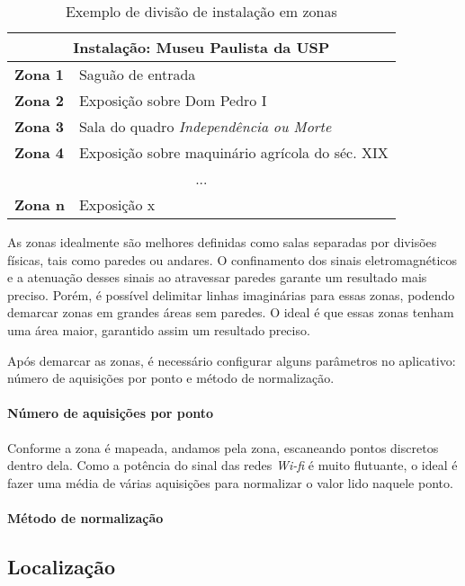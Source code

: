 \begin{table}[htb]
\centering
\caption{Exemplo de divisão de instalação em zonas}
\label{my-label}
\begin{tabular}{|l|l|l|l|l|}
\hline
\multicolumn{5}{|c|}{\textbf{Instalação: Museu Paulista da USP}}             \\ \hline
\multicolumn{2}{|l|}{\textbf{Zona 1}} & \multicolumn{3}{l|}{Saguão de entrada}          \\ \hline
\multicolumn{2}{|l|}{\textbf{Zona 2}} & \multicolumn{3}{l|}{Exposição sobre Dom Pedro I}          \\ \hline
\multicolumn{2}{|l|}{\textbf{Zona 3}} & \multicolumn{3}{l|}{Sala do quadro \textit{Independência ou Morte}}          \\ \hline
\multicolumn{2}{|l|}{\textbf{Zona 4}} & \multicolumn{3}{l|}{Exposição sobre maquinário agrícola do séc. XIX}          \\ \hline
\multicolumn{5}{|c|}{...}                                                    \\ \hline
\multicolumn{2}{|l|}{\textbf{Zona n}} & \multicolumn{3}{l|}{Exposição x}     \\ \hline
\end{tabular}
\end{table}

As zonas idealmente são melhores definidas como salas separadas por divisões físicas, tais como paredes ou andares. O confinamento dos sinais eletromagnéticos e a atenuação desses sinais ao atravessar paredes garante um resultado mais preciso. Porém, é possível delimitar linhas imaginárias para essas zonas, podendo demarcar zonas em grandes áreas sem paredes. O ideal é que essas zonas tenham uma área maior, garantido assim um resultado preciso.
\par
Após demarcar as zonas, é necessário configurar alguns parâmetros no aplicativo: número de aquisições por ponto e método de normalização.

\paragraph*{Número de aquisições por ponto\\}
Conforme a zona é mapeada, andamos pela zona, escaneando pontos discretos dentro dela. Como a potência do sinal das redes \textit{Wi-fi} é muito flutuante, o ideal é fazer uma média de várias aquisições para normalizar o valor lido naquele ponto.
\paragraph*{Método de normalização\\}


\subsection{Localização}